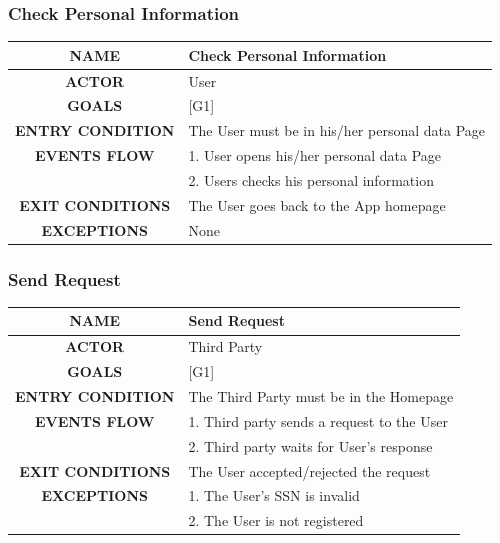 \documentclass[12pt,a4paper]{article}
\begin{document}
	\subsubsection{Check Personal Information}
	\begin{center}
		\begin{tabular}{| c | l |}
			\hline
			\textbf{NAME} & Check Personal Information \\
			\hline
			\textbf{ACTOR} & User \\
			\hline
			\textbf{GOALS} & [G1] \\
			\hline
			\textbf{ENTRY CONDITION} & The User must be in his/her personal data Page \\ \hline
			\textbf{EVENTS FLOW}  &
			1. User opens his/her personal data Page\\
			&2. Users checks his personal information\\
			\hline
			\textbf{EXIT CONDITIONS}  & The User goes back to the App homepage \\ \hline
			\textbf{EXCEPTIONS} & 
			None\\
			\hline
		\end{tabular}
	\end{center}

	\subsubsection{Send Request}
	\begin{center}
		\begin{tabular}{| c | l |}
			\hline
			\textbf{NAME} & Send Request \\
			\hline
			\textbf{ACTOR} & Third Party \\
			\hline
			\textbf{GOALS} & [G1] \\
			\hline
			\textbf{ENTRY CONDITION} & The Third Party must be in the Homepage \\ \hline
			\textbf{EVENTS FLOW}  &
			1. Third party sends a request to the User\\
			&2. Third party waits for User's response\\
			\hline
			\textbf{EXIT CONDITIONS}  & The User accepted/rejected the request \\ \hline
			\textbf{EXCEPTIONS} & 
			1. The User's SSN is invalid\\
			&2. The User is not registered\\
			\hline
		\end{tabular}
	\end{center}
\end{document}
